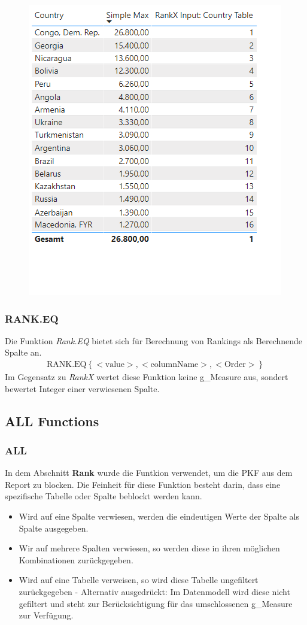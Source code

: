\begin{figure}[H]
	\centering
	\includegraphics[scale = 0.3]{attachment/chapter_1/Scc154}
\end{figure}

\subsubsection{RANK.EQ}
Die Funktion \textit{Rank.EQ} bietet sich für Berechnung von Rankings als Berechnende Spalte an.
\begin{align*}
	\text{RANK.EQ} \left\lbrace <\text{value}>,<\text{columnName}>,<\text{Order}>\right\rbrace
\end{align*}
Im Gegensatz zu \textit{RankX} wertet diese Funktion keine \gls{g_Measure} aus, sondert bewertet Integer einer verwiesenen Spalte.

\subsection{ALL Functions}
\subsubsection{ALL}
In dem Abschnitt \textbf{Rank} wurde die  Funtkion verwendet, um die \gls{PKF} aus dem Report zu blocken. Die Feinheit für diese Funktion besteht darin, dass eine spezifische Tabelle oder Spalte beblockt werden kann. 
\begin{itemize}
	\item Wird auf eine Spalte verwiesen, werden die eindeutigen Werte der Spalte als Spalte ausgegeben.
	\item Wir auf mehrere Spalten verwiesen, so werden diese in ihren möglichen Kombinationen zurückgegeben.
	\item Wird auf eine Tabelle verweisen, so wird diese Tabelle ungefiltert zurückgegeben - Alternativ ausgedrückt: Im Datenmodell wird diese nicht gefiltert und steht zur Berücksichtigung für das umschlossenen \gls{g_Measure} zur Verfügung.
\end{itemize}

